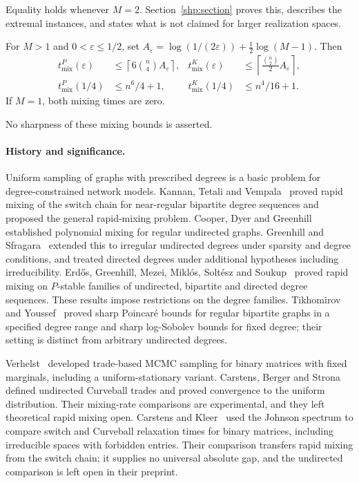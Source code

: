 Equality holds whenever $M=2$. Section~\ref{shp:section} proves this,
describes the extremal instances, and states what is not claimed for larger
realization spaces.

\begin{corollary}\label{cor:mixing}
For $M>1$ and $0<\varepsilon\le1/2$, set
$A_\varepsilon=\log(1/(2\varepsilon))+\tfrac12\log(M-1)$. Then
\begin{align}
 t_{\mathrm{mix}}^P(\varepsilon)&\le\left\lceil6\binom n4 A_\varepsilon\right\rceil,
 &t_{\mathrm{mix}}^K(\varepsilon)&\le\left\lceil\frac{\binom n2}{2}
 A_\varepsilon\right\rceil,\label{eq:mixing}\\
 t_{\mathrm{mix}}^P(1/4)&\le n^6/4+1,
 &t_{\mathrm{mix}}^K(1/4)&\le n^4/16+1.\label{eq:coarse}
\end{align}
If $M=1$, both mixing times are zero.
\end{corollary}

No sharpness of these mixing bounds is asserted.

\paragraph{History and significance.}
Uniform sampling of graphs with prescribed degrees is a basic problem for
degree-constrained network models. Kannan, Tetali and Vempala~\cite{KTV99}
proved rapid mixing of the switch chain for near-regular bipartite degree
sequences and proposed the general rapid-mixing problem. Cooper, Dyer and
Greenhill~\cite{CDG07,CDG12} established polynomial mixing for regular
undirected graphs. Greenhill and Sfragara~\cite{GS18} extended this to
irregular undirected degrees under sparsity and degree conditions, and treated
directed degrees under additional hypotheses including irreducibility.
Erd\H{o}s, Greenhill, Mezei, Mikl\'os, Solt\'esz and Soukup~\cite{Unified22}
proved rapid mixing on $P$-stable families of undirected, bipartite and
directed degree sequences. These results impose restrictions on the degree
families. Tikhomirov and Youssef~\cite{TY23} proved sharp Poincar\'e bounds
for regular bipartite graphs in a specified degree range and sharp
log-Sobolev bounds for fixed degree; their setting is distinct from arbitrary
undirected degrees.

Verhelst~\cite{Verhelst08} developed trade-based MCMC sampling for binary
matrices with fixed marginals, including a uniform-stationary variant.
Carstens, Berger and Strona~\cite{CBS18} defined undirected Curveball trades
and proved convergence to the uniform distribution. Their mixing-rate
comparisons are experimental, and they left theoretical rapid mixing open.
Carstens and Kleer~\cite{CK18} used the Johnson spectrum to compare switch and
Curveball relaxation times for binary matrices, including irreducible spaces
with forbidden entries. Their comparison transfers rapid mixing from the
switch chain; it supplies no universal absolute gap, and the undirected
comparison is left open in their preprint.

